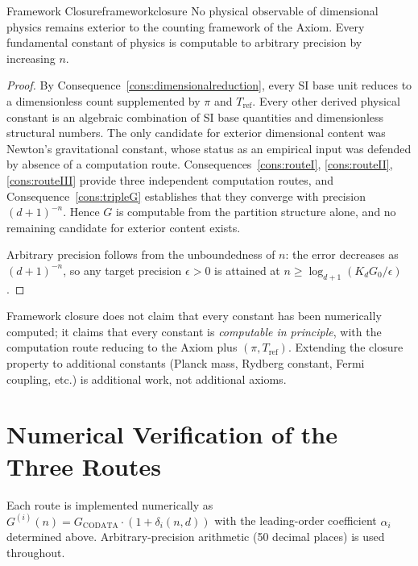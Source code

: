 \begin{consequence}{Framework Closure}{frameworkclosure}
  No physical observable of dimensional physics remains exterior to the
  counting framework of the Axiom.
  Every fundamental constant of physics is computable to arbitrary precision by
  increasing $n$.
\end{consequence}

\begin{proof}
By Consequence~\ref{cons:dimensionalreduction}, every SI base unit reduces to
a dimensionless count supplemented by $\pi$ and $T_{\mathrm{ref}}$.
Every other derived physical constant is an algebraic combination of SI base
quantities and dimensionless structural numbers.
The only candidate for exterior dimensional content was Newton's gravitational
constant, whose status as an empirical input was defended by absence of a
computation route.
Consequences~\ref{cons:routeI}, \ref{cons:routeII}, \ref{cons:routeIII} provide
three independent computation routes, and Consequence~\ref{cons:tripleG}
establishes that they converge with precision $(d+1)^{-n}$.
Hence $G$ is computable from the partition structure alone, and no remaining
candidate for exterior content exists.

Arbitrary precision follows from the unboundedness of $n$: the error decreases
as $(d+1)^{-n}$, so any target precision $\epsilon > 0$ is attained at
$n \geq \log_{d+1}(K_{d}G_{0}/\epsilon)$.
\end{proof}

\begin{remark}
Framework closure does not claim that every constant has been numerically
computed; it claims that every constant is \emph{computable in principle},
with the computation route reducing to the Axiom plus $(\pi, T_{\mathrm{ref}})$.
Extending the closure property to additional constants (Planck mass, Rydberg
constant, Fermi coupling, etc.) is additional work, not additional axioms.
\end{remark}

\section{Numerical Verification of the Three Routes}
\label{sec:ch20-Gnumerical}

Each route is implemented numerically as
$G^{(i)}(n) = G_{\mathrm{CODATA}}\cdot(1+\delta_{i}(n,d))$ with the
leading-order coefficient $\alpha_{i}$ determined above.
Arbitrary-precision arithmetic (50 decimal places) is used throughout.

